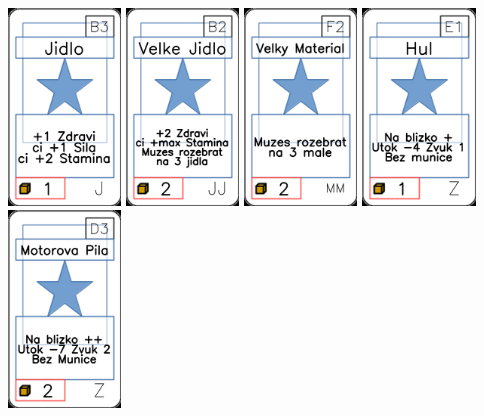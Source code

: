 \documentclass[a4paper]{article}
\begin{document}
	\includegraphics[width=3.0cm]{img-1_7}
	\includegraphics[width=3.0cm]{img-1_36}
	\includegraphics[width=3.0cm]{img-1_56}
	\includegraphics[width=3.0cm]{img-1_80}
	\includegraphics[width=3.0cm]{img-1_107}
\end{document}
